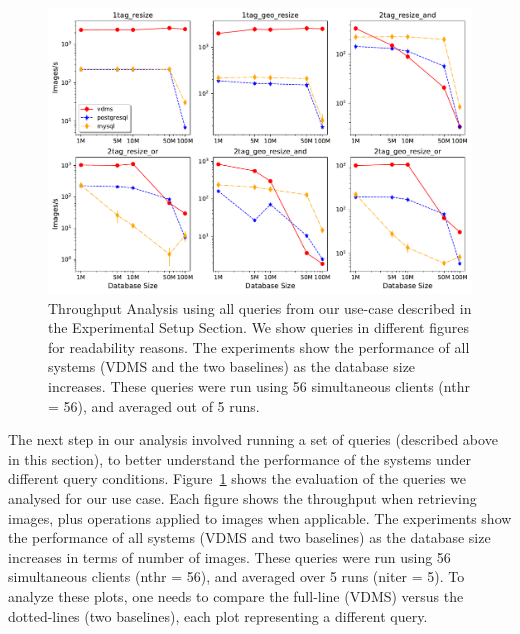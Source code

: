 \begin{figure}[ht]
\includegraphics[width=\columnwidth]{figures/plot_th_56_mosaic_results_throughput}
\caption{Throughput Analysis using all queries from our use-case
described in the Experimental Setup Section.
We show queries in different figures for readability reasons.
The experiments show the performance of all systems (VDMS and the two baselines) as the
database size increases.
These queries were run using 56 simultaneous clients (nthr = 56),
and averaged out of 5 runs.}
\label{fig:q_throughput_56}
\end{figure}

The next step in our analysis involved running a set of queries
(described above in this section),
to better understand the performance of the systems under different query conditions.
Figure~\ref{fig:q_throughput_56} shows the evaluation of the
queries we analysed for our use case.
Each figure shows the throughput when retrieving images,
plus operations applied to images when applicable.
The experiments show the performance of all systems (VDMS and two baselines) as the
database size increases in terms of number of images.
These queries were run using 56 simultaneous clients (nthr = 56),
and averaged over 5 runs (niter = 5).
To analyze these plots, one needs to compare the full-line (VDMS) versus the
dotted-lines (two baselines), each plot representing a different query.

